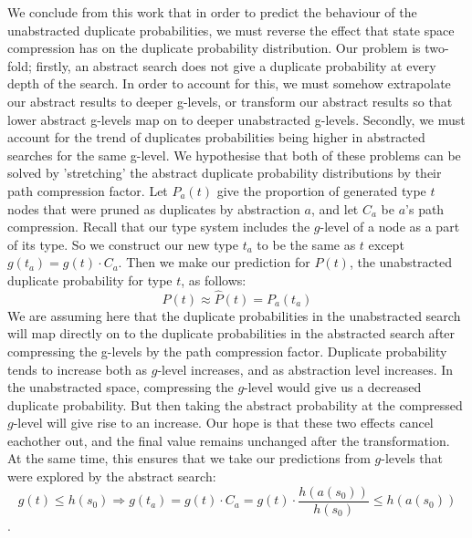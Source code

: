 \documentclass{article}
\begin{document}
We conclude from this work that in order to predict the behaviour of the unabstracted duplicate probabilities,
we must reverse the effect that state space compression has on the duplicate probability distribution.
Our problem is two-fold;
firstly, an abstract search does not give a duplicate probability at every depth of the search.
In order to account for this, we must somehow extrapolate our abstract results to deeper g-levels,
or transform our abstract results so that lower abstract g-levels map on to deeper unabstracted g-levels.
Secondly, we must account for the trend of duplicates probabilities being higher in abstracted searches for the same g-level.
We hypothesise that both of these problems can be solved by 'stretching' the abstract duplicate probability distributions by
their path compression factor.
Let \(P_a(t)\) give the proportion of generated type \(t\) nodes that were pruned as duplicates by abstraction \(a\),
and let \(C_a\) be \(a\)'s path compression.
Recall that our type system includes the \(g\)-level of a node as a part of its type.
So we construct our new type \(t_a\) to be the same as \(t\) except \(g(t_a) = g(t) \cdot C_a\).
Then we make our prediction for \(P(t)\), the unabstracted duplicate probability for type \(t\), as follows:
 \[P(t) \approx \hat{P}(t) = P_a(t_a)\]
 We are assuming here that the duplicate probabilities in the unabstracted search
 will map directly on to the duplicate probabilities in the abstracted search after compressing the g-levels
 by the path compression factor.
 Duplicate probability tends to increase both as \(g\)-level increases, and as abstraction level increases.
 In the unabstracted space,
 compressing the \(g\)-level would give us a decreased duplicate probability.
 But then taking the abstract probability at the compressed \(g\)-level will give rise to an increase.
 Our hope is that these two effects cancel eachother out, and the final value remains unchanged after
 the transformation.
 At the same time, this ensures that we take our predictions from \(g\)-levels that were explored by the abstract search:
 \[g(t) \leq h(s_0) \Rightarrow g(t_a) = g(t) \cdot C_a = g(t) \cdot \frac{h(a(s_0))}{h(s_0)} \leq h(a(s_0))\]. \\
\end{document}
